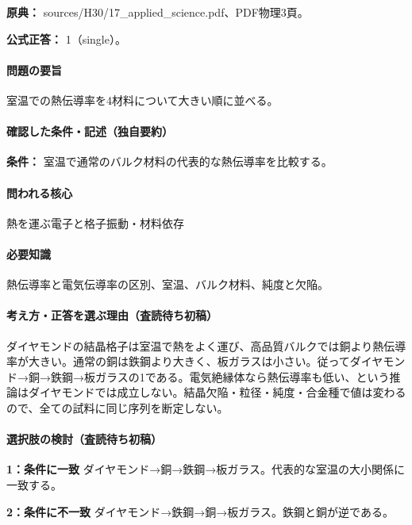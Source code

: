 \noindent\textbf{原典：} sources/H30/17\_applied\_science.pdf、PDF物理3頁。

\textbf{公式正答：} 1（single）。

\paragraph{問題の要旨} 室温での熱伝導率を4材料について大きい順に並べる。

\paragraph{確認した条件・記述（独自要約）}\mbox{}\par

\noindent\textbf{条件：} 室温で通常のバルク材料の代表的な熱伝導率を比較する。\par

\paragraph{問われる核心} 熱を運ぶ電子と格子振動・材料依存

\paragraph{必要知識} 熱伝導率と電気伝導率の区別、室温、バルク材料、純度と欠陥。

\paragraph{考え方・正答を選ぶ理由（査読待ち初稿）} ダイヤモンドの結晶格子は室温で熱をよく運び、高品質バルクでは銅より熱伝導率が大きい。通常の銅は鉄鋼より大きく、板ガラスは小さい。従ってダイヤモンド→銅→鉄鋼→板ガラスの1である。電気絶縁体なら熱伝導率も低い、という推論はダイヤモンドでは成立しない。結晶欠陥・粒径・純度・合金種で値は変わるので、全ての試料に同じ序列を断定しない。

\paragraph{選択肢の検討（査読待ち初稿）}\mbox{}\par

\noindent\textbf{1：条件に一致} ダイヤモンド→銅→鉄鋼→板ガラス。代表的な室温の大小関係に一致する。\par

\noindent\textbf{2：条件に不一致} ダイヤモンド→鉄鋼→銅→板ガラス。鉄鋼と銅が逆である。\par

